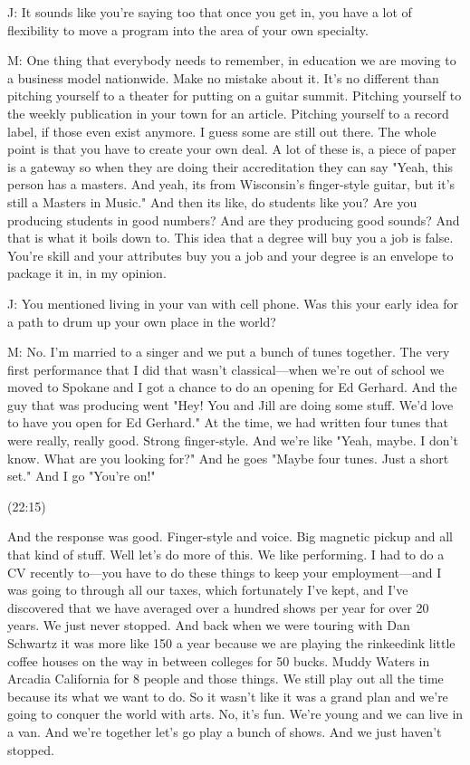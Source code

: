 \documentclass[11pt]{article}
\begin{document}
J: It sounds like you're saying too that once you get in, you have a lot of flexibility to move a program into the area of your own specialty. 

M: One thing that everybody needs to remember, in education we are moving to a business model nationwide. Make no mistake about it. It's no different than pitching yourself to a theater for putting on a guitar summit. Pitching yourself to the weekly publication in your town for an article. Pitching yourself to a record label, if those even exist anymore. I guess some are still out there. The whole point is that you have to create your own deal. A lot of these is, a piece of paper is a gateway so when they are doing their accreditation they can say "Yeah, this person has a masters. And yeah, its from Wisconsin's finger-style guitar, but it's still a Masters in Music." And then its like, do students like you? Are you producing students in good numbers? And are they producing good sounds? And that is what it boils down to. This idea that a degree will buy you a job is false. You're skill and your attributes buy you a job and your degree is an envelope to package it in, in my opinion. 

J: You mentioned living in your van with cell phone. Was this your early idea for a path to drum up your own place in the world?

M: No. I'm married to a singer and we put a bunch of tunes together. The very first performance that I did that wasn't classical—when we're out of school we moved to Spokane and I got a chance to do an opening for Ed Gerhard. And the guy that was producing went "Hey! You and Jill are doing some stuff. We'd love to have you open for Ed Gerhard." At the time, we had written four tunes that were really, really good. Strong finger-style. And we're like "Yeah, maybe. I don't know. What are you looking for?" And he goes "Maybe four tunes. Just a short set." And I go "You're on!" 

(22:15)

And the response was good. Finger-style and voice. Big magnetic pickup and all that kind of stuff. Well let's do more of this. We like performing. I had to do a CV recently to—you have to do these things to keep your employment—and I was going to through all our taxes, which fortunately I've kept, and I've discovered that we have averaged over a hundred shows per year for over 20 years. We just never stopped. And back when we were touring with Dan Schwartz it was more like 150 a year because we are playing the rinkeedink little coffee houses on the way in between colleges for 50 bucks. Muddy Waters in Arcadia California for 8 people and those things. We still play out all the time because its what we want to do. So it wasn't like it was a grand plan and we're going to conquer the world with arts. No, it's fun. We're young and we can live in a van. And we're together let's go play a bunch of shows. And we just haven't stopped.
\end{document}
